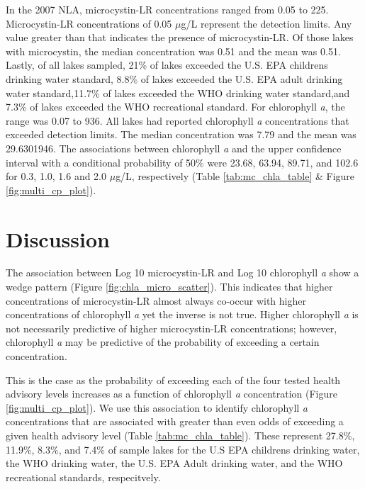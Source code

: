 \documentclass[11pt,]{article}
\begin{document}
In the 2007 NLA, microcystin-LR concentrations ranged from 0.05 to 225.
Microcystin-LR concentrations of 0.05 \(\mu\)g/L represent the detection
limits. Any value greater than that indicates the presence of
microcystin-LR. Of those lakes with microcystin, the median
concentration was 0.51 and the mean was 0.51. Lastly, of all lakes
sampled, 21\% of lakes exceeded the U.S. EPA childrens drinking water
standard, 8.8\% of lakes exceeded the U.S. EPA adult drinking water
standard,11.7\% of lakes exceeded the WHO drinking water standard,and
7.3\% of lakes exceeded the WHO recreational standard. For chlorophyll
\emph{a}, the range was 0.07 to 936. All lakes had reported chlorophyll
\emph{a} concentrations that exceeded detection limits. The median
concentration was 7.79 and the mean was 29.6301946. The associations
between chlorophyll \emph{a} and the upper confidence interval with a
conditional probability of 50\% were 23.68, 63.94, 89.71, and 102.6 for
0.3, 1.0, 1.6 and 2.0 \(\mu\)g/L, respectively (Table
\ref{tab:mc_chla_table} \& Figure \ref{fig:multi_cp_plot}).

\section{Discussion}\label{discussion}

The association between Log 10 microcystin-LR and Log 10 chlorophyll
\emph{a} show a wedge pattern (Figure \ref{fig:chla_micro_scatter}).
This indicates that higher concentrations of microcystin-LR almost
always co-occur with higher concentrations of chlorophyll \emph{a} yet
the inverse is not true. Higher chlorophyll \emph{a} is not necessarily
predictive of higher microcystin-LR concentrations; however, chlorophyll
\emph{a} may be predictive of the probability of exceeding a certain
concentration.

This is the case as the probability of exceeding each of the four tested
health advisory levels increases as a function of chlorophyll \emph{a}
concentration (Figure \ref{fig:multi_cp_plot}). We use this association
to identify chlorophyll \emph{a} concentrations that are associated with
greater than even odds of exceeding a given health advisory level (Table
\ref{tab:mc_chla_table}). These represent 27.8\%, 11.9\%, 8.3\%, and
7.4\% of sample lakes for the U.S EPA childrens drinking water, the WHO
drinking water, the U.S. EPA Adult drinking water, and the WHO
recreational standards, respecitvely.
\end{document}

